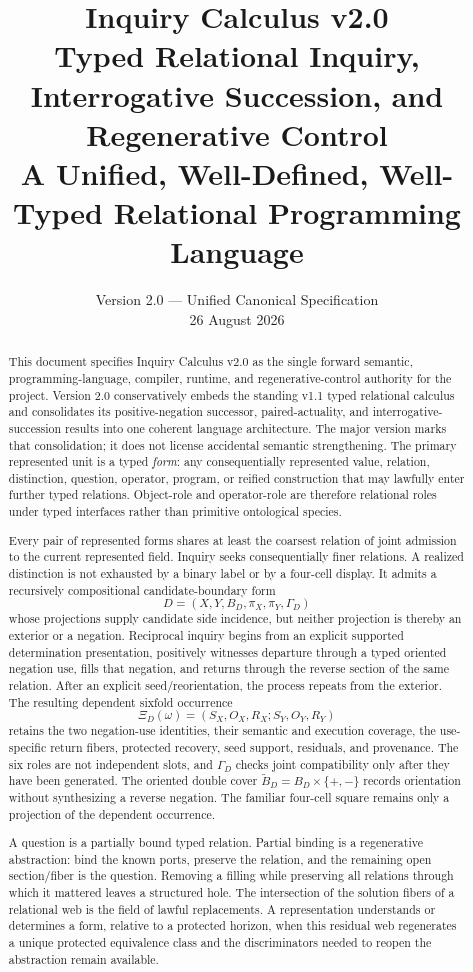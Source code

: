 \documentclass[11pt,oneside]{article}
\title{\textbf{Inquiry Calculus v2.0}\\
\large Typed Relational Inquiry, Interrogative Succession, and Regenerative Control\\
\normalsize A Unified, Well-Defined, Well-Typed Relational Programming Language}
\author{}
\date{Version 2.0 --- Unified Canonical Specification\\26 August 2026}
\begin{document}
\maketitle

\begin{abstract}
This document specifies Inquiry Calculus v2.0 as the single forward semantic,
programming-language, compiler, runtime, and regenerative-control authority for the project.
Version 2.0 conservatively embeds the standing v1.1 typed relational calculus and consolidates its
positive-negation successor, paired-actuality, and interrogative-succession results into one
coherent language architecture.  The major version marks that consolidation; it does not license
accidental semantic strengthening.  The primary represented unit is a typed \emph{form}: any
consequentially represented value, relation, distinction, question, operator, program, or reified
construction that may lawfully enter further typed relations.  Object-role and operator-role are
therefore relational roles under typed interfaces rather than primitive ontological species.

Every pair of represented forms shares at least the coarsest relation of joint admission to the current represented field.  Inquiry seeks consequentially finer relations.  A realized distinction is not exhausted by a binary label or by a four-cell display.  It admits a recursively compositional candidate-boundary form
\[
D=(X,Y,B_D,\pi_X,\pi_Y,\Gamma_D)
\]
whose projections supply candidate side incidence, but neither projection is thereby an exterior or a negation.  Reciprocal inquiry begins from an explicit supported determination presentation, positively witnesses departure through a typed oriented negation use, fills that negation, and returns through the reverse section of the same relation.  After an explicit seed/reorientation, the process repeats from the exterior.  The resulting dependent sixfold occurrence
\[
\Xi_D(\omega)=(S_X,O_X,R_X;S_Y,O_Y,R_Y)
\]
retains the two negation-use identities, their semantic and execution coverage, the use-specific return fibers, protected recovery, seed support, residuals, and provenance.  The six roles are not independent slots, and \(\Gamma_D\) checks joint compatibility only after they have been generated.  The oriented double cover \(\widetilde B_D=B_D\times\{+,-\}\) records orientation without synthesizing a reverse negation.  The familiar four-cell square remains only a projection of the dependent occurrence.

A question is a partially bound typed relation.  Partial binding is a regenerative abstraction:
bind the known ports, preserve the relation, and the remaining open section/fiber is the question.
Removing a filling while preserving all relations through which it mattered leaves a structured
hole.  The intersection of the solution fibers of a relational web is the field of lawful
replacements.  A representation understands or determines a form, relative to a protected
horizon, when this residual web regenerates a unique protected equivalence class and the
discriminators needed to reopen the abstraction remain available.


\end{abstract}
\end{document}
